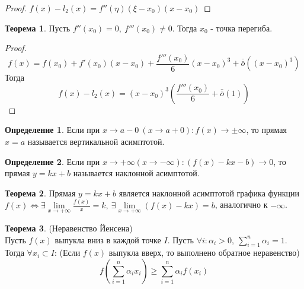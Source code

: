 \documentclass[a4paper, 12pt]{article}
\theoremstyle{definition}
\newtheorem*{definition}{Определение}
\newtheorem*{theorem}{Теорема}
\begin{document}
        \begin{proof}
            $f(x)-l_2(x)=f''(\eta)(\xi-x_0)(x-x_0)$
        \end{proof} 
        \begin{theorem}
            Пусть $f''(x_0)=0,\ f'''(x_0)\ne 0$. Тогда $x_0$ - точка перегиба.
        \end{theorem} 
        \begin{proof}
            \[f(x)=f(x_0)+f'(x_0)(x-x_0)+\frac{f'''(x_0)}{6}(x-x_0)^3+\bar{\bar{o}}{((x-x_0)^3)}\] 
            Тогда
            \[f(x)-l_2(x)=(x-x_0)^3(\frac{f'''(x_0)}{6}+\bar{\bar{o}}{(1)})\]
        \end{proof} 
        \begin{definition}
            Если при $x\to a-0\ (x\to a+0): f(x)\to \pm \infty$, то прямая $x=a$ называется вертикальной асимптотой.
        \end{definition} 
        \begin{definition}
            Если при $x\to +\infty (x\to -\infty): (f(x)-kx-b)\to 0$, то прямая $y=kx+b$ называется наклонной асимптотой.
        \end{definition} 
        \begin{theorem}
            Прямая $y=kx+b$ является наклонной асимптотой графика функции $f(x) \Leftrightarrow \exists \lim\limits_{x\to +\infty}\frac{f(x)}{x}=k,\ \exists \lim\limits_{x\to +\infty}(f(x)-kx)=b$, аналогично к $-\infty$.
        \end{theorem} 
        \begin{theorem} (Неравенство Йенсена)\\
            Пусть $f(x)$ выпукла вниз в каждой точке $I$. Пусть $\forall i: \alpha_i>0,\ \sum\limits_{i=1}^{n}\alpha_i=1$. Тогда $\forall x_i \subset I$: (Если $f(x)$ выпукла вверх, то выполнено обратное неравенство)
            \[f(\sum\limits_{i=1}^{n}\alpha_i x_i) \geq \sum\limits_{i=1}^{n}\alpha_i f(x_i)\]
        \end{theorem} 
\end{document}
